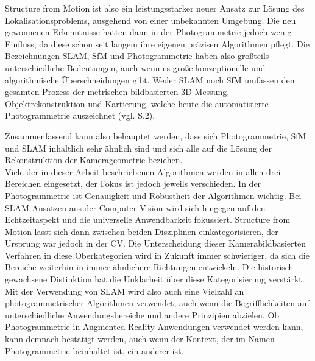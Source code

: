 Structure from Motion ist also ein leistungsstarker neuer Ansatz zur Lösung des Lokalisationsproblems, ausgehend von einer unbekannten Umgebung. Die neu gewonnenen Erkenntnisse hatten dann in der Photogrammetrie jedoch wenig Einfluss, da diese schon seit langem ihre eigenen präzisen Algorithmen pflegt. Die Bezeichnungen SLAM, SfM und Photogrammetrie haben also großteils unterschiedliche Bedeutungen, auch wenn es große konzeptionelle und algorithmische Überschneidungen gibt. Weder SLAM noch SfM umfassen den gesamten Prozess der metrischen bildbasierten 3D-Messung, Objektrekonstruktion und Kartierung, welche heute die automatisierte Photogrammetrie auszeichnet (vgl. \cite{vergleich_fraser} S.2). 

Zusammenfassend kann also behauptet werden, dass sich Photogrammetrie, SfM und SLAM inhaltlich sehr ähnlich sind und sich alle auf die Lösung der Rekonstruktion der Kamerageometrie beziehen. \\ Viele der in dieser Arbeit beschriebenen Algorithmen werden in allen drei Bereichen eingesetzt, der Fokus ist jedoch jeweils verschieden. In der Photogrammetrie ist Genauigkeit und Robustheit der Algorithmen wichtig. Bei SLAM Ansätzen aus der Computer Vision wird sich hingegen auf den Echtzeitaspekt und die universelle Anwendbarkeit fokussiert. Structure from Motion lässt sich dann zwischen beiden Disziplinen einkategorisieren, der Ursprung war jedoch in der CV. Die Unterscheidung dieser Kamerabildbasierten Verfahren in diese Oberkategorien wird in Zukunft immer schwieriger, da sich die Bereiche weiterhin in immer ähnlichere Richtungen entwickeln. Die historisch gewachsene Distinktion hat die Unklarheit über diese Kategorisierung verstärkt. Mit der Verwendung von SLAM wird also auch eine Vielzahl an photogrammetrischer Algorithmen verwendet, auch wenn die Begrifflichkeiten auf unterschiedliche Anwendungsbereiche und andere Prinzipien abzielen. Ob Photogrammetrie in Augmented Reality Anwendungen verwendet werden kann, kann demnach bestätigt werden, auch wenn der Kontext, der im Namen Photogrammetrie beinhaltet ist, ein anderer ist.


